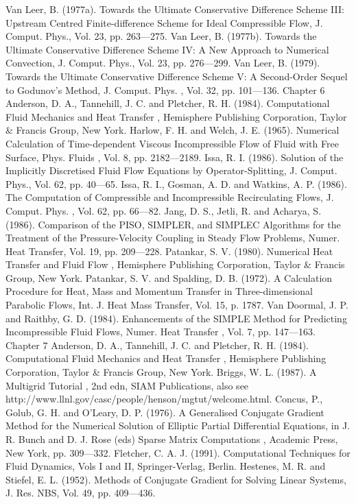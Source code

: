 \documentclass[11pt,a4paper,openany,fontset=none]{ctexbook}
\begin{document}
\begin{sloppypar}
{\small Van Leer, B. (1977a). Towards the Ultimate Conservative Difference Scheme III: Upstream Centred Finite-difference Scheme for Ideal Compressible Flow, J. Comput. Phys., Vol. 23, pp. 263—275. Van Leer, B. (1977b). Towards the Ultimate Conservative Difference Scheme IV: A New Approach to Numerical Convection, J. Comput. Phys., Vol. 23, pp. 276—299. Van Leer, B. (1979). Towards the Ultimate Conservative Difference Scheme V: A Second-Order Sequel to Godunov’s Method, J. Comput. Phys. , Vol. 32, pp. 101—136. Chapter 6 Anderson, D. A., Tannehill, J. C. and Pletcher, R. H. (1984). Computational Fluid Mechanics and Heat Transfer , Hemisphere Publishing Corporation, Taylor \& Francis Group, New York. Harlow, F. H. and Welch, J. E. (1965). Numerical Calculation of Time-dependent Viscous Incompressible Flow of Fluid with Free Surface, Phys. Fluids , Vol. 8, pp. 2182—2189. Issa, R. I. (1986). Solution of the Implicitly Discretised Fluid Flow Equations by Operator-Splitting, J. Comput. Phys., Vol. 62, pp. 40—65. Issa, R. I., Gosman, A. D. and Watkins, A. P. (1986). The Computation of Compressible and Incompressible Recirculating Flows, J. Comput. Phys. , Vol. 62, pp. 66—82. Jang, D. S., Jetli, R. and Acharya, S. (1986). Comparison of the PISO, SIMPLER, and SIMPLEC Algorithms for the Treatment of the Pressure-Velocity Coupling in Steady Flow Problems, Numer. Heat Transfer, Vol. 19, pp. 209—228. Patankar, S. V. (1980). Numerical Heat Transfer and Fluid Flow , Hemisphere Publishing Corporation, Taylor \& Francis Group, New York. Patankar, S. V. and Spalding, D. B. (1972). A Calculation Procedure for Heat, Mass and Momentum Transfer in Three-dimensional Parabolic Flows, Int. J. Heat Mass Transfer, Vol. 15, p. 1787. Van Doormal, J. P. and Raithby, G. D. (1984). Enhancements of the SIMPLE Method for Predicting Incompressible Fluid Flows, Numer. Heat Transfer , Vol. 7, pp. 147—163. Chapter 7 Anderson, D. A., Tannehill, J. C. and Pletcher, R. H. (1984). Computational Fluid Mechanics and Heat Transfer , Hemisphere Publishing Corporation, Taylor \& Francis Group, New York. Briggs, W. L. (1987). A Multigrid Tutorial , 2nd edn, SIAM Publications, also see http://www.llnl.gov/casc/people/henson/mgtut/welcome.html. Concus, P., Golub, G. H. and O’Leary, D. P. (1976). A Generalised Conjugate Gradient Method for the Numerical Solution of Elliptic Partial Differential Equations, in J. R. Bunch and D. J. Rose (eds) Sparse Matrix Computations , Academic Press, New York, pp. 309—332. Fletcher, C. A. J. (1991). Computational Techniques for Fluid Dynamics, Vols I and II, Springer-Verlag, Berlin. Hestenes, M. R. and Stiefel, E. L. (1952). Methods of Conjugate Gradient for Solving Linear Systems, J. Res. NBS, Vol. 49, pp. 409—436.}\par

\end{sloppypar}
\end{document}
